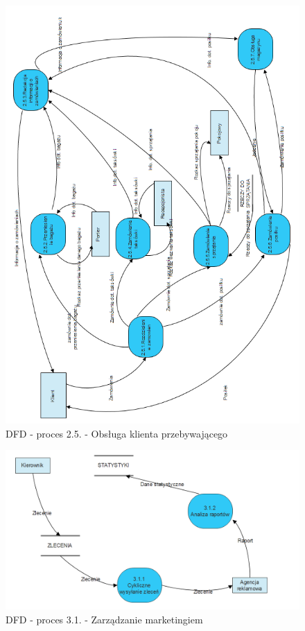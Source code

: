 \documentclass[a4paper, 11pt]{article}
\begin{document}
	\begin{figure}[H]%
			\center
			\includegraphics[scale=0.9]{Img/2-5.png}
			\caption{DFD - proces 2.5. - Obsługa klienta przebywającego}
	\end{figure}
	\begin{figure}[H]%
			\center
			\includegraphics[scale=0.65]{Img/3-1.png}
			\caption{DFD - proces 3.1. - Zarządzanie marketingiem}
	\end{figure}
	
\end{document}
